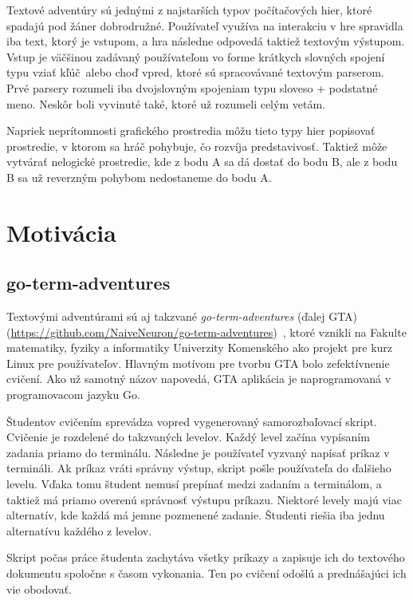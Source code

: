 Textové adventúry sú jednými z najstarších typov počítačových hier, ktoré spadajú
pod žáner dobrodružné. Používateľ využíva na interakciu v hre spravidla iba text,
ktorý je vstupom, a hra následne odpovedá taktiež textovým výstupom.
Vstup je väčšinou zadávaný používateľom vo forme krátkych slovných spojení
typu \glqq vziať kľúč\grqq~alebo \glqq choď vpred\grqq, ktoré sú spracovávané
textovým parserom. Prvé parsery rozumeli iba dvojslovným spojeniam typu sloveso + podstatné meno. Neskôr boli vyvinuté také, ktoré už rozumeli celým vetám.

Napriek neprítomnosti grafického prostredia môžu tieto typy hier popisovať prostredie, v ktorom sa hráč pohybuje, čo rozvíja predstavivosť. Taktiež môže vytvárať nelogické
prostredie, kde z bodu A sa dá dostať do bodu B, ale z bodu B sa už reverzným pohybom
nedostaneme do bodu A.~\cite{bib:adventures}


\section{Motivácia}
\label{sec:motivacia}

\subsection{go-term-adventures}
\label{sec:motivacia:gta}

Textovými adventúrami sú aj takzvané \textit{go-term-adventures} (ďalej GTA) (\url{https://github.com/NaiveNeuron/go-term-adventures})~\cite{bib:gta}, ktoré vznikli
na Fakulte matematiky, fyziky a informatiky Univerzity Komenského ako projekt pre kurz Linux pre používateľov. Hlavným motívom pre tvorbu GTA bolo zefektívnenie cvičení.
Ako už samotný názov napovedá, GTA aplikácia je naprogramovaná v programovacom
jazyku Go.

Študentov cvičením sprevádza vopred vygenerovaný samorozbaľovací skript. Cvičenie
je rozdelené do takzvaných levelov. Každý level začína vypísaním zadania priamo do
terminálu. Následne je používateľ vyzvaný napísať príkaz v termináli. Ak príkaz
vráti správny výstup, skript pošle používateľa do ďalšieho levelu. Vďaka tomu
študent nemusí prepínať medzi zadaním a terminálom, a taktiež má priamo overenú
správnosť výstupu príkazu. Niektoré levely majú viac alternatív, kde každá
má jemne pozmenené zadanie. Študenti riešia iba jednu alternatívu každého z levelov.

Skript počas práce študenta zachytáva všetky príkazy a zapisuje ich do textového
dokumentu spoločne s časom vykonania. Ten po cvičení odošlú a prednášajúci ich vie
obodovať.

